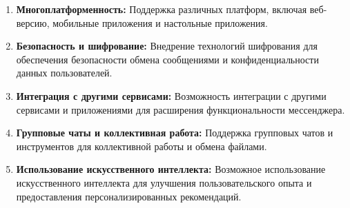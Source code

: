 \begin{enumerate}
	\item \textbf{Многоплатформенность:} Поддержка различных платформ, включая веб-версию, мобильные приложения и настольные приложения.
	\item \textbf{Безопасность и шифрование:} Внедрение технологий шифрования для обеспечения безопасности обмена сообщениями и конфиденциальности данных пользователей.
	\item \textbf{Интеграция с другими сервисами:} Возможность интеграции с другими сервисами и приложениями для расширения функциональности мессенджера.
	\item \textbf{Групповые чаты и коллективная работа:} Поддержка групповых чатов и инструментов для коллективной работы и обмена файлами.
	\item \textbf{Использование искусственного интеллекта:} Возможное использование искусственного интеллекта для улучшения пользовательского опыта и предоставления персонализированных рекомендаций.


\end{enumerate}
